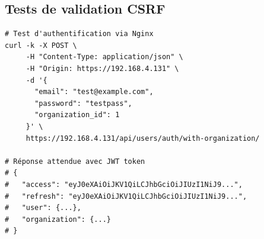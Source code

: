 \documentclass[12pt,a4paper]{article}
\begin{document}
\subsection{Tests de validation CSRF}

\begin{lstlisting}[style=bash, caption={Tests d'authentification après résolution CSRF}]
# Test d'authentification via Nginx
curl -k -X POST \
     -H "Content-Type: application/json" \
     -H "Origin: https://192.168.4.131" \
     -d '{
       "email": "test@example.com",
       "password": "testpass",
       "organization_id": 1
     }' \
     https://192.168.4.131/api/users/auth/with-organization/

# Réponse attendue avec JWT token
# {
#   "access": "eyJ0eXAiOiJKV1QiLCJhbGciOiJIUzI1NiJ9...",
#   "refresh": "eyJ0eXAiOiJKV1QiLCJhbGciOiJIUzI1NiJ9...",
#   "user": {...},
#   "organization": {...}
# }
\end{lstlisting}
\end{document}
